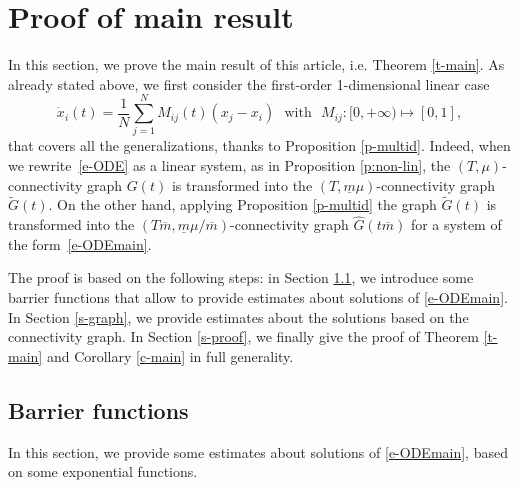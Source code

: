 \documentclass[journal]{article}
\newcommand{\FR}[1]{{\textcolor{red}{#1}}}
\begin{document}
\section{Proof of main result}
\label{s-main}

In this section, we prove the main result of this article, i.e. Theorem \ref{t-main}. As already stated above, we first  consider the first-order 1-dimensional linear case
\begin{equation}
\label{e-ODEmain}
\dot x_i(t)=\frac{1}{N}\sum_{j=1}^N M_{ij}(t) (x_j-x_i)\mbox{~~with~~}M_{ij}:[0,+\infty)\mapsto [0,1],
 \end{equation}
 that covers all the generalizations, thanks to Proposition \ref{p-multid}. Indeed, when we rewrite~\eqref{e-ODE} as a linear system, as in Proposition \ref{p:non-lin}, the $(T,\mu)$-connectivity graph $G(t)$ is transformed into the $(T,\underline{m}\mu)$-connectivity graph $\tilde G(t)$. On the other hand, applying Proposition \ref{p-multid} the graph $\tilde G(t)$ is transformed into the $(T\overline{m},\underline{m}\mu/\overline{m})$-connectivity graph $\hat G(t\overline{m})$ for a system of the form~\eqref{e-ODEmain}.
 
 The proof is based on the following steps: in Section \ref{s-barrier}, we introduce some barrier functions that allow to provide estimates about solutions of \eqref{e-ODEmain}. In Section \ref{s-graph}, we provide estimates about the solutions based on the connectivity graph. In Section \ref{s-proof}, we finally give the proof of Theorem \ref{t-main} and Corollary \ref{c-main} in full generality.
 
 \subsection{Barrier functions}
 \label{s-barrier}
 
  
 In this section, we provide some estimates about solutions of \eqref{e-ODEmain}, based on some exponential functions.
\end{document}
